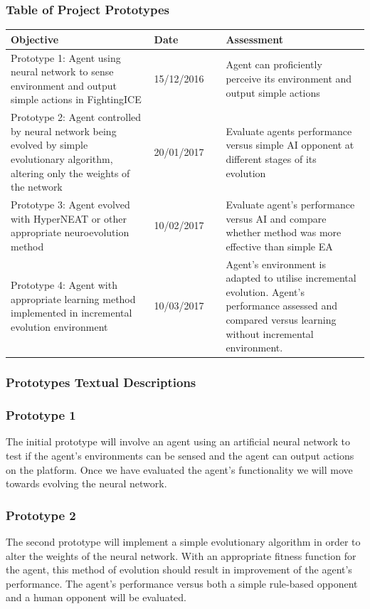 \documentclass[11pt,a4paper]{article}
\begin{document}
\subsubsection{Table of Project Prototypes}
\begin{tabular}{|p{0.4\linewidth}|p{0.2\linewidth}|p{0.4\linewidth}|}
\hline
Objective & Date & Assessment\\ \hline
Prototype 1: Agent using neural network to sense environment and output simple actions in FightingICE & 15/12/2016 & Agent can proficiently perceive its environment and output simple actions\\ \hline
Prototype 2: Agent controlled by neural network being evolved by simple evolutionary algorithm, altering only the weights of the network & 20/01/2017 & Evaluate agents performance versus simple AI opponent at different stages of its evolution\\ \hline
Prototype 3: Agent evolved with HyperNEAT or other appropriate neuroevolution method & 10/02/2017 & Evaluate agent's performance versus AI and compare whether method was more effective than simple EA\\ \hline
Prototype 4: Agent with appropriate learning method implemented in incremental evolution environment & 10/03/2017 & Agent's environment is adapted to utilise incremental evolution. Agent's performance assessed and compared versus learning without incremental environment.\\ \hline
\end{tabular}
\newpage
\subsubsection{Prototypes Textual Descriptions}
\subsubsection*{Prototype 1}
The initial prototype will involve an agent using an artificial neural network to test if the agent's environments can be sensed and the agent can output actions on the platform. Once we have evaluated the agent's functionality we will move towards evolving the neural network.

\subsubsection*{Prototype 2}
The second prototype will implement a simple evolutionary algorithm in order to alter the weights of the neural network. With an appropriate fitness function for the agent, this method of evolution should result in improvement of the agent's performance. The agent's performance versus both a simple rule-based opponent and a human opponent will be evaluated.
\end{document}
